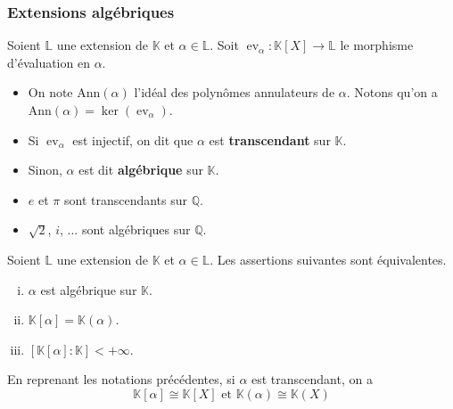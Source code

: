 	\subsubsection{Extensions algébriques}
	
	
	\begin{definition}
		Soient $\mathbb{L}$ une extension de $\mathbb{K}$ et $\alpha \in \mathbb{L}$. Soit $\operatorname{ev}_\alpha : \mathbb{K}[X] \rightarrow \mathbb{L}$ le morphisme d'évaluation en $\alpha$.
		\begin{itemize}
			\item On note $\mathrm{Ann}(\alpha)$ l'idéal des polynômes annulateurs de $\alpha$. Notons qu'on a $\mathrm{Ann}(\alpha) = \ker(\operatorname{ev}_\alpha)$.
			\item Si $\operatorname{ev}_\alpha$ est injectif, on dit que $\alpha$ est \textbf{transcendant} sur $\mathbb{K}$.
			\item Sinon, $\alpha$ est dit \textbf{algébrique} sur $\mathbb{K}$.
		\end{itemize}
	\end{definition}
	
	\begin{example}
		\begin{itemize}
			\item $e$ et $\pi$ sont transcendants sur $\mathbb{Q}$.
			\item $\sqrt{2}$, $i$, ... sont algébriques sur $\mathbb{Q}$.
		\end{itemize}
	\end{example}
	
	\begin{proposition}
		Soient $\mathbb{L}$ une extension de $\mathbb{K}$ et $\alpha \in \mathbb{L}$. Les assertions suivantes sont équivalentes.
		\begin{enumerate}[(i)]
			\item $\alpha$ est algébrique sur $\mathbb{K}$.
			\item $\mathbb{K}[\alpha] = \mathbb{K}(\alpha)$.
			\item $[\mathbb{K}[\alpha]:\mathbb{K}] < +\infty$.
		\end{enumerate}
	\end{proposition}
	
	\begin{proposition}
		En reprenant les notations précédentes, si $\alpha$ est transcendant, on a
		\[ \mathbb{K}[\alpha] \cong \mathbb{K}[X] \text{ et } \mathbb{K}(\alpha) \cong \mathbb{K}(X) \]
	\end{proposition}
	

